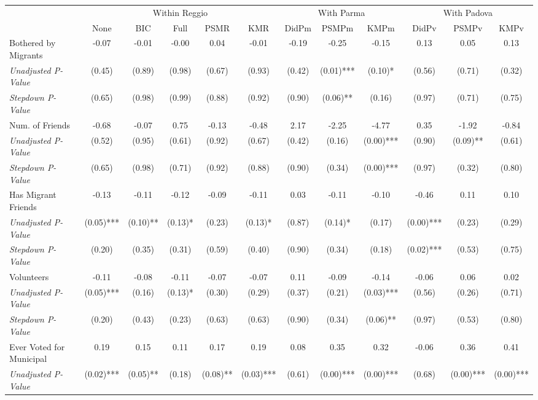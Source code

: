 \begin{tabular}{l c c c c c c c c c c c}
\toprule
& \multicolumn{5}{c}{Within Reggio} & \multicolumn{3}{c}{With Parma} & \multicolumn{3}{c}{With Padova} \\\cmidrule(lr){2-6} \cmidrule(lr){7-9} \cmidrule(lr){10-12}
 & None & BIC & Full & PSMR & KMR & DidPm & PSMPm & KMPm & DidPv & PSMPv & KMPv \\
\midrule
Bothered by Migrants & -0.07 & -0.01 & -0.00 & 0.04 & -0.01 & -0.19 & -0.25 & -0.15 & 0.13 & 0.05 & 0.13 \\
\quad \textit{Unadjusted P-Value} & (0.45) & (0.89) & (0.98) & (0.67) & (0.93) & (0.42) & (0.01)*** & (0.10)* & (0.56) & (0.71) & (0.32) \\
\quad \textit{Stepdown P-Value} & (0.65) & (0.98) & (0.99) & (0.88) & (0.92) & (0.90) & (0.06)** & (0.16) & (0.97) & (0.71) & (0.75) \\
Num. of Friends & -0.68 & -0.07 & 0.75 & -0.13 & -0.48 & 2.17 & -2.25 & -4.77 & 0.35 & -1.92 & -0.84 \\
\quad \textit{Unadjusted P-Value} & (0.52) & (0.95) & (0.61) & (0.92) & (0.67) & (0.42) & (0.16) & (0.00)*** & (0.90) & (0.09)** & (0.61) \\
\quad \textit{Stepdown P-Value} & (0.65) & (0.98) & (0.71) & (0.92) & (0.88) & (0.90) & (0.34) & (0.00)*** & (0.97) & (0.32) & (0.80) \\
Has Migrant Friends & -0.13 & -0.11 & -0.12 & -0.09 & -0.11 & 0.03 & -0.11 & -0.10 & -0.46 & 0.11 & 0.10 \\
\quad \textit{Unadjusted P-Value} & (0.05)*** & (0.10)** & (0.13)* & (0.23) & (0.13)* & (0.87) & (0.14)* & (0.17) & (0.00)*** & (0.23) & (0.29) \\
\quad \textit{Stepdown P-Value} & (0.20) & (0.35) & (0.31) & (0.59) & (0.40) & (0.90) & (0.34) & (0.18) & (0.02)*** & (0.53) & (0.75) \\
Volunteers & -0.11 & -0.08 & -0.11 & -0.07 & -0.07 & 0.11 & -0.09 & -0.14 & -0.06 & 0.06 & 0.02 \\
\quad \textit{Unadjusted P-Value} & (0.05)*** & (0.16) & (0.13)* & (0.30) & (0.29) & (0.37) & (0.21) & (0.03)*** & (0.56) & (0.26) & (0.71) \\
\quad \textit{Stepdown P-Value} & (0.20) & (0.43) & (0.23) & (0.63) & (0.63) & (0.90) & (0.34) & (0.06)** & (0.97) & (0.53) & (0.80) \\
Ever Voted for Municipal & 0.19 & 0.15 & 0.11 & 0.17 & 0.19 & 0.08 & 0.35 & 0.32 & -0.06 & 0.36 & 0.41 \\
\quad \textit{Unadjusted P-Value} & (0.02)*** & (0.05)** & (0.18) & (0.08)** & (0.03)*** & (0.61) & (0.00)*** & (0.00)*** & (0.68) & (0.00)*** & (0.00)*** \\

\end{tabular}
